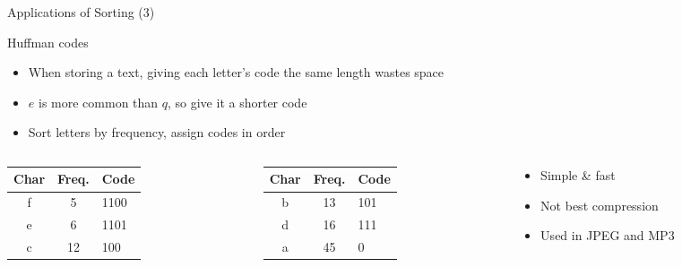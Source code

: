 \begin{frame}{Applications of Sorting (3)}
  \begin{block}{Huffman codes}
    \begin{itemize}
    \item When storing a text, giving each letter's code the same length wastes
      space
    \item {} $e$ is more common than $q$, so give it a
      shorter code
    \item {} Sort letters by frequency, assign codes
      in order
    \end{itemize}
    \begin{columns}
      \begin{column}{.3\linewidth}
        \begin{tabular}{|c|c|l|}\hline
          Char&Freq.&Code\\\hline
          f&5&1100\\
          e&6&1101\\
          c&12&100\\\hline
        \end{tabular}        
      \end{column}
      \begin{column}{.3\linewidth}
        \begin{tabular}{|c|c|l|}\hline
          Char&Freq.&Code\\\hline
          b&13&101\\
          d&16&111\\
          a&45&0\\\hline
        \end{tabular}
      \end{column}
      \begin{column}{.35\linewidth}
        \begin{itemize}
        \item Simple \& fast
        \item Not best compression
        \item Used in JPEG and MP3
        \end{itemize}
      \end{column}
    \end{columns}
  \end{block}
\end{frame}
